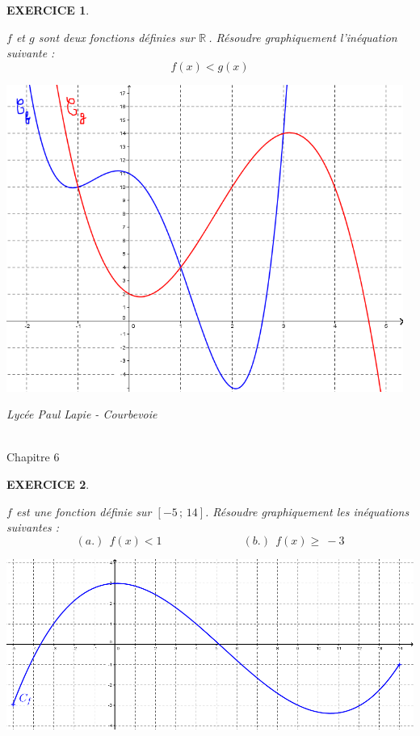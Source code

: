 \documentclass[a4paper]{article}   %
\renewcommand{\(}{\left(}
\renewcommand{\)}{\right)}
\newtheorem{EXO}{\large EXERCICE }
\newenvironment{EX}   { \setcounter{ques}{0} \begin{EXO} \hrulefill ~\vspace{0.3cm}

\normalfont}    {\end{EXO} \medskip}
\newcommand{\R}{ ${\mathbb R} ~$}
\newcommand{\se}{\geqslant~} 		%
\def\cl{{\Large \bf{2nde}}}
\begin{document}
\begin{EX}
$f$ et $g$ sont deux fonctions définies sur \R. Résoudre graphiquement l'inéquation suivante : 
$$f(x) < g(x) $$
\begin{center}
\includegraphics[width=13cm]{6inters.png}
\end{center}
\end{EX}
\newpage \setcounter{EXO}{0}
\noindent\begin{minipage}{.20\linewidth}\begin{center}                  
\noindent \emph{Lycée Paul Lapie - Courbevoie}
\end{center}\end{minipage}
\begin{minipage}{1.5\linewidth}\begin{center}	
\noindent \cl \\ Chapitre 6
\end{center}\end{minipage}

\begin{center} 	
\end{center}

\begin{EX}
$f$ est une fonction définie sur $[-5\,;\,14]$. Résoudre graphiquement les inéquations suivantes : 
$$(a.)~~f(x) < 1 \hspace{3cm} (b.)~~f(x) \se -3$$
\begin{center}
\includegraphics[width=15cm]{6exo1.png}
\end{center}
\end{EX}
\end{document}
